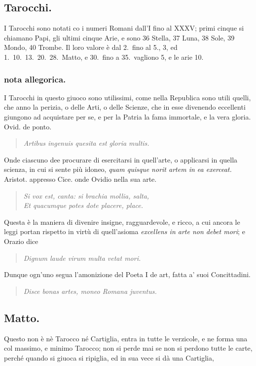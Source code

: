 \documentclass[11pt,a6paper]{article}
\newcommand{\literaryquote}[1]{%
\kern -6pt  \begin{verse}
    {\footnotesize \it #1}
  \end{verse}\kern -2pt%
}
\begin{document}
\subsection{Tarocchi.}

I Tarocchi sono notati co i numeri Romani
dall'I fino al XXXV; primi cinque si chiamano
Papi, gli ultimi cinque Arie, e sono
36 Stella, 37 Luna, 38 Sole, 39 Mondo,
40 Trombe. Il loro valore è dal 2.\ fino al 5., 3,
ed 1.\ 10.\ 13.\ 20.\ 28.\ Matto, e 30.\ fino a
35.\ vagliono 5, e le arie 10.

\subsubsection{nota allegorica.}
{\footnotesize
I Tarocchi in questo giuoco sono utilissimi,
come nella Republica sono utili quelli, che anno la
perizia, o delle Arti, o delle Scienze, che in esse
divenendo eccellenti giungono ad acquistare per se,
e per la Patria la fama immortale, e la vera gloria.
Ovid. de ponto.

\literaryquote{Artibus ingenuis quesita est gloria multis.}

Onde ciascuno dee procurare di esercitarsi in
quell'arte, o applicarsi in quella scienza, in cui
si sente
più idoneo, \textit{quam quisque norit artem in ea
 exerceat.} Aristot. appresso Cice. onde Ovidio
nella sua arte.

\literaryquote{Si vox est, canta: si brachia mollia, salta,\\
 Et quacumque potes dote placere, place.}

Questa è la maniera di divenire insigne, ragguardevole,
e ricco, a cui ancora le leggi portan rispetto
in virtù di quell'asioma \textit{excellens in arte non debet
mori}; e Orazio dice

\literaryquote{Dignum laude virum multa vetat mori.}

Dunque ogn'uno segua l'amonizione del Poeta I
de art, fatta a' suoi Concittadini.

\literaryquote{Disce bonas artes, moneo Romana juventus.}

}
\subsection{Matto.}

Questo non è nè Tarocco né Cartiglia,
entra in tutte le verzicole, e ne forma
una col massimo, e minimo Tarocco;
non si perde mai se non si perdono
tutte le carte, perché quando si giuoca si
ripiglia, ed in sua vece si dà una Cartiglia,
\end{document}
